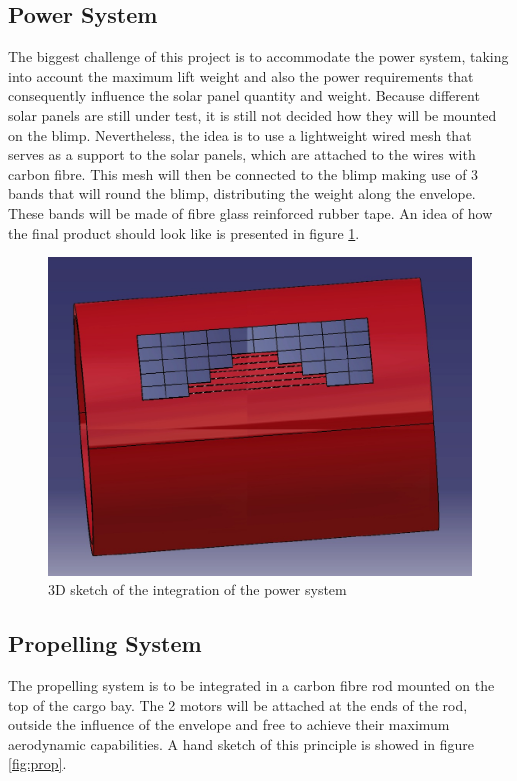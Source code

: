 \subsection{Power System}

The biggest challenge of this project is to accommodate the power system, taking into account the maximum lift weight and also the power requirements that consequently influence the solar panel quantity and weight. Because different solar panels are still under test, it is still not decided how they will be mounted on the blimp. Nevertheless, the idea is to use a lightweight wired mesh that serves as a support to the solar panels, which are attached to the wires with carbon fibre. This mesh will then be connected to the blimp making use of 3 bands that will round the blimp, distributing the weight along the envelope. These bands will be made of fibre glass reinforced rubber tape. An idea of how the final product should look like is presented in figure \ref{fig:mesh}.

\begin{figure}[bht]
\centering
\includegraphics[scale=0.3]{figures/mesh.jpg}
\caption{3D sketch of the integration of the power system}
\label{fig:mesh}
\end{figure}

\subsection{Propelling System}

The propelling system is to be integrated in a carbon fibre rod mounted on the top of the cargo bay. The 2 motors will be attached at the ends of the rod, outside the influence of the envelope and free to achieve their maximum aerodynamic capabilities. A hand sketch of this principle is showed in figure \ref{fig:prop}.

